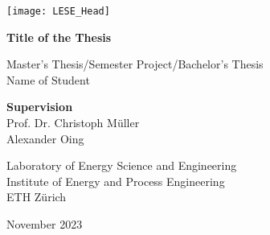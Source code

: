 

\fontfamily{\sfdefault}\selectfont
\begin{center}

\texttt{[image: LESE\_Head]}

\vspace{3cm} 

\LARGE{\textbf{Title of the Thesis}}\\

\vspace{3cm} 


\Large{Master's Thesis/Semester Project/Bachelor's Thesis}\\
\vspace{2cm}
\Large{Name of Student}\\

\vfill


\normalsize{\textbf{Supervision}}\\
\vspace{0.2cm}
\normalsize{Prof. Dr. Christoph Müller}\\
\vspace{0.2cm}
\normalsize{Alexander Oing}\\
\vspace{2cm}

\normalsize{Laboratory of Energy Science and Engineering}\\
\vspace{0.2cm}
\normalsize{Institute of Energy and Process Engineering}\\
\vspace{0.2cm}
\normalsize{ETH Zürich}\\
\vspace{1cm}



\normalsize{November 2023}



\end{center}
\restoregeometry
\cleardoublepage
